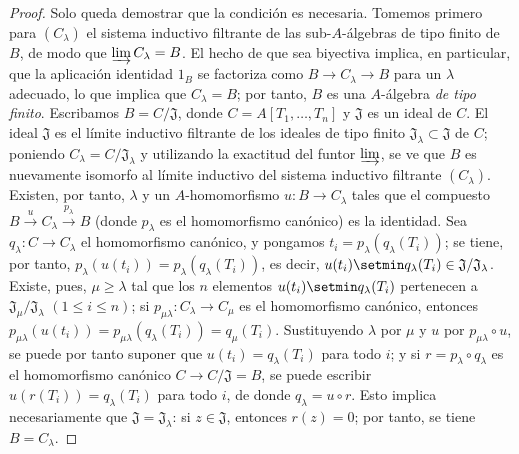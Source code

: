 \begin{proof}
Solo queda demostrar que la condición es necesaria.
Tomemos primero para $(C_\lambda)$ el sistema inductivo filtrante de las sub-$A$-álgebras de tipo finito de $B$, de modo que $\varinjlim C_\lambda=B$.
El hecho de que  sea biyectiva implica, en particular, que la aplicación identidad $1_B$ se factoriza como $B\to C_\lambda\to B$ para un $\lambda$ adecuado, lo que implica que $C_\lambda=B$; por tanto, $B$ es una $A$-álgebra \emph{de tipo finito}.
Escribamos $B=C/\mathfrak J$, donde $C=A[T_1,\ldots,T_n]$ y $\mathfrak J$ es un ideal de $C$. El ideal $\mathfrak J$ es el límite inductivo filtrante de los ideales de tipo finito $\mathfrak J_\lambda\subset\mathfrak J$ de $C$; poniendo $C_\lambda=C/\mathfrak J_\lambda$ y utilizando la exactitud del funtor $\varinjlim$, se ve que $B$ es nuevamente isomorfo al límite inductivo del sistema inductivo filtrante $(C_\lambda)$.
Existen, por tanto, $\lambda$ y un $A$-homomorfismo $u:B\to C_\lambda$ tales que el compuesto $B\xrightarrow{u}C_\lambda\xrightarrow{p_\lambda}B$ (donde $p_\lambda$ es el homomorfismo canónico) es la identidad.
Sea $q_\lambda:C\to C_\lambda$ el homomorfismo canónico, y pongamos
$t_i=p_\lambda(q_\lambda(T_i))$; se tiene, por tanto, $p_\lambda(u(t_i))=p_\lambda(q_\lambda(T_i))$, es decir,
$u(t_i)\setmin q_\lambda(T_i)\in\mathfrak J/\mathfrak J_\lambda$.
Existe, pues, $\mu\geqslant\lambda$ tal que los $n$ elementos $u(t_i)\setmin q_\lambda(T_i)$ pertenecen a
$\mathfrak J_\mu/\mathfrak J_\lambda$ $(1\leqslant i\leqslant n)$; si $p_{\mu\lambda}:C_\lambda\to C_\mu$ es el homomorfismo canónico, entonces
$p_{\mu\lambda}(u(t_i))
=p_{\mu\lambda}(q_\lambda(T_i))=q_\mu(T_i)$.
Sustituyendo $\lambda$ por $\mu$ y $u$ por $p_{\mu\lambda}\circ u$, se puede por tanto
suponer que $u(t_i)=q_\lambda(T_i)$ para todo $i$; y si
$r=p_\lambda\circ q_\lambda$ es el homomorfismo canónico
$C\to C/\mathfrak J=B$, se puede escribir $u(r(T_i))=q_\lambda(T_i)$ para todo $i$,
de donde $q_\lambda=u\circ r$.
Esto implica necesariamente que $\mathfrak J=\mathfrak J_\lambda$: si $z\in\mathfrak J$, entonces $r(z)=0$; por tanto, se tiene $B=C_\lambda$.


\end{proof}
